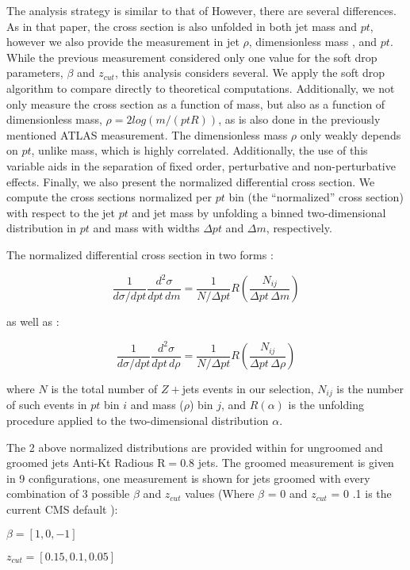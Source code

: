 The analysis strategy is similar to that of %
However, there are several differences. As in that paper, the cross section is also
unfolded in both jet mass and $pt$, however we also provide the measurement in jet $\rho$, dimensionless mass , and $pt$. While the previous measurement considered only one value for the soft drop parameters, $\beta$ and $z_{cut}$, this analysis considers several.
We apply the soft drop algorithm to compare
directly to theoretical computations. Additionally, we not only measure the cross section as a function of mass, but also as a function of dimensionless mass, $\rho = 2log(m/(pt R))$, as is also done in the previously mentioned ATLAS measurement.  The dimensionless mass $\rho$ only weakly depends on $pt$, unlike mass, which is highly correlated. Additionally, the use of this variable aids in the separation of fixed order, perturbative and non-perturbative effects.
Finally, we also present the normalized differential cross section. We compute the cross sections normalized per $pt$ bin
(the ``normalized'' cross section) with respect to the jet $pt$ and jet mass 
by unfolding a binned two-dimensional distribution in $pt$ and mass
with widths $\Delta pt$ and $\Delta m$, respectively.

The normalized differential cross section in two forms :

\begin{equation}
\frac{1}{d\sigma/dpt}\frac{d^2\sigma}{dpt\,dm} = \frac{1}{N/\Delta pt} R(\frac{N_{ij}}{ \Delta pt \,\Delta m} )
\end{equation}


as well as :

\begin{equation}
\frac{1}{d\sigma/dpt}\frac{d^2\sigma}{dpt\,d\rho} = \frac{1}{N/\Delta pt} R(\frac{N_{ij}}{ \Delta pt \,\Delta \rho} )
\end{equation}


where $N$ is the total number of $Z+$jets events in our selection,
$N_{ij}$ is the number of such events in $pt$ bin $i$ and mass ($\rho$) bin $j$,
and $R(\alpha)$ is the unfolding procedure applied to the two-dimensional
distribution $\alpha$.

The 2 above normalized distributions are provided within for ungroomed  and groomed jets Anti-Kt Radious R$= 0.8$ jets. The groomed measurement is given in 9 configurations, one measurement is shown for jets groomed with every combination of 3 possible $\beta$ and $z_{cut}$ values (Where $\beta$ = 0 and $z_{cut}$ = 0 .1 is the current CMS default ):


$ \beta = [ 1,  0 , -1 ]  $

$ z_{cut}  = [ 0.15, 0.1, 0.05 ] $ 


